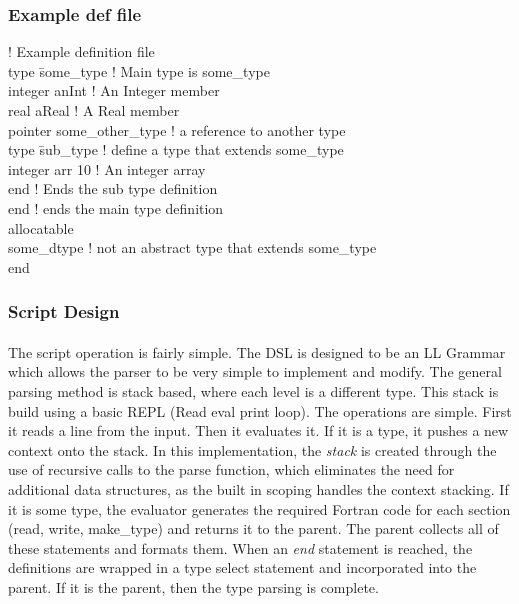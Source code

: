 \documentclass{article}
\begin{document}
\subsubsection{Example def file}
\begin{tabbing}
! Example definition file \\
type \= some\_type ! Main type is some\_type \\
\> integer anInt ! An Integer member \\
\> real aReal ! A Real member \\
\> pointer some\_other\_type ! a reference to another type \\
\> type \= sub\_type ! define a type that extends some\_type \\
\> \> integer arr 10 ! An integer array \\
\> end ! Ends the sub type definition \\
end ! ends the main type definition \\
allocatable \\
\> some\_dtype ! not an abstract type that extends some\_type \\
end \\
\end{tabbing}

\subsubsection{Script Design}
\paragraph{}
The script operation is fairly simple. The DSL is designed to be an LL Grammar which allows the parser to be very simple to implement and modify. The general parsing method is stack based, where each level is a different type. This stack is build using a basic REPL (Read eval print loop). The operations are simple. First it reads a line from the input. Then it evaluates it. If it is a type, it pushes a new context onto the stack. In this implementation, the \emph{stack} is created through the use of recursive calls to the parse function, which eliminates the need for additional data structures, as the built in scoping handles the context stacking. If it is some type, the evaluator generates the required Fortran code for each section (read, write, make\_type) and returns it to the parent. The parent collects all of these statements and formats them. When an \emph{end} statement is reached, the definitions are wrapped in a type select statement and incorporated into the parent. If it is the parent, then the type parsing is complete.
\end{document}

